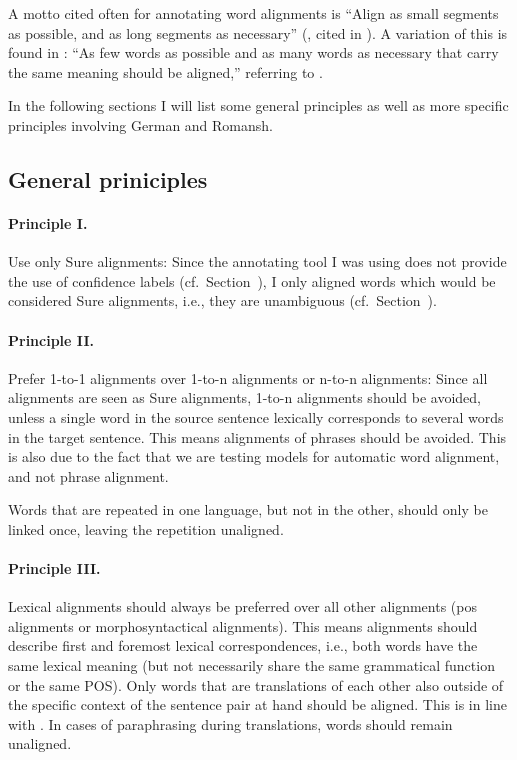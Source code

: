 A motto cited often for annotating word alignments is \enquote{Align as small segments as possible, and as long segments as necessary} (\cite{Vronis00evaluationof}, cited in \cite{lines2007}). A variation of this is found in \cite{clematide2018}: \enquote{As few words as possible and as many words as necessary that carry the same meaning should be aligned,} referring to \cite{lambert2005}. 

In the following sections I will list some general principles as well as more specific principles involving German and Romansh.

\subsection{General priniciples}
\label{sec:gold-principles}
\paragraph{Principle I.} 
Use only Sure alignments: 
Since the annotating tool I was using does not provide the use of confidence labels (cf.~Section~), I only aligned words which would be considered Sure alignments, i.e., they are unambiguous (cf.~Section~). 


\paragraph{Principle II.}
Prefer 1-to-1 alignments over 1-to-n alignments or n-to-n alignments: 
Since all alignments are seen as Sure alignments, 1-to-n alignments should be avoided, unless a single word in the source sentence lexically corresponds to several words in the target sentence. %
This means alignments of phrases should be avoided. This is also due to the fact that we are testing models for automatic word alignment, and not phrase alignment.



Words that are repeated in one language, but not in the other, should only be linked once, leaving the repetition unaligned.

\paragraph{Principle III.}
Lexical alignments should always be preferred over all other alignments (\acrfull{pos} alignments or morphosyntactical alignments). 
This means alignments should describe first and foremost lexical correspondences, i.e., both words have the same lexical meaning (but not necessarily share the same grammatical function or the same POS).
Only words that are translations of each other also outside of the specific context of the sentence pair at hand should be aligned. This is in line with \cite{clematide2018}.
In cases of paraphrasing during translations, words should remain unaligned. %


